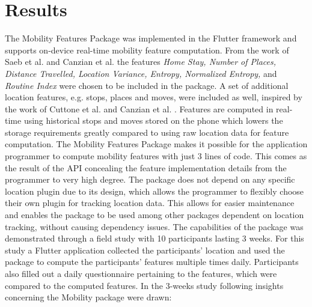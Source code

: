 \section{Results}
The Mobility Features Package was implemented in the Flutter framework and supports on-device real-time mobility feature computation. From the work of Saeb et al. \cite{Saeb2015} and Canzian et al. \cite{Canzian2015} the features \textit{Home Stay, Number of Places, Distance Travelled, Location Variance, Entropy, Normalized Entropy,} and \textit{Routine Index} were chosen to be included in the package. A set of additional location features, e.g. stops, places and moves, were included as well, inspired by the work of Cuttone et al. \cite{sparse-location-2014} and Canzian et al. \cite{Canzian2015}. Features are computed in real-time using historical stops and moves stored on the phone which lowers the storage requirements greatly compared to using raw location data for feature computation. The Mobility Features Package makes it possible for the application programmer to compute mobility features with just 3 lines of code. This comes as the result of the API concealing the feature implementation details from the programmer to very high degree. The package does not depend on any specific location plugin due to its design, which allows the programmer to flexibly choose their own plugin for tracking location data. This allows for easier maintenance and enables the package to be used among other packages dependent on location tracking, without causing dependency issues. The capabilities of the package was demonstrated through a field study with 10 participants lasting 3 weeks. For this study a Flutter application collected the participants' location and used the package to compute the participants' features multiple times daily. Participants also filled out a daily questionnaire pertaining to the features, which were compared to the computed features. In the 3-weeks study following insights concerning the Mobility package were drawn:

